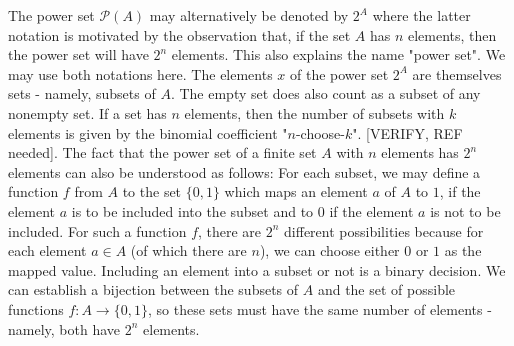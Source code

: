 

\medskip
The power set $\mathcal{P}(A)$ may alternatively be denoted by $2^A$ where the latter notation is motivated by the observation that, if the set $A$ has $n$ elements, then the power set will have $2^n$ elements. This also explains the name "power set". We may use both notations here. The elements $x$ of the power set $2^A$ are themselves sets - namely, subsets of $A$. The empty set does also count as a subset of any nonempty set. If a set has $n$ elements, then the number of subsets with $k$ elements is given by the binomial coefficient "$n$-choose-$k$". [VERIFY, REF needed]. The fact that the power set of a finite set $A$ with $n$ elements has $2^n$ elements can also be understood as follows: For each subset, we may define a function $f$ from $A$ to the set $\{0,1\}$ which maps an element $a$ of $A$ to $1$, if the element $a$ is to be included into the subset and to $0$ if the element $a$ is not to be included. For such a function $f$, there are $2^n$ different possibilities because for each element $a \in A$ (of which there are $n$), we can choose either $0$ or $1$ as the mapped value. Including an element into a subset or not is a binary decision. We can establish a bijection between the subsets of $A$ and the set of possible functions $f: A \rightarrow \{0,1\}$, so these sets must have the same number of elements - namely, both have $2^n$ elements.

